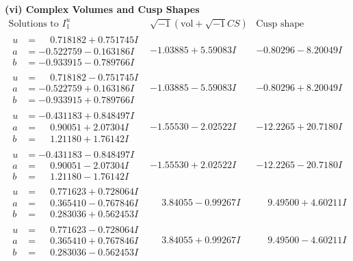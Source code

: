 \documentclass[1p]{elsarticle_modified}
\theoremstyle{definition}
\newcommand{\I}{\sqrt{-1}}
\begin{document}
\newpage\flushleft \textbf{(vi) Complex Volumes and Cusp Shapes}
$$\begin{array}{c|c|c}  
\text{Solutions to }I^u_{1}& \I (\text{vol} + \sqrt{-1}CS) & \text{Cusp shape}\\
 \hline 
\begin{aligned}
u &= \phantom{-}0.718182 + 0.751745 I \\
a &= -0.522759 - 0.163186 I \\
b &= -0.933915 - 0.789766 I\end{aligned}
 & -1.03885 + 5.59083 I & -0.80296 - 8.20049 I \\ \hline\begin{aligned}
u &= \phantom{-}0.718182 - 0.751745 I \\
a &= -0.522759 + 0.163186 I \\
b &= -0.933915 + 0.789766 I\end{aligned}
 & -1.03885 - 5.59083 I & -0.80296 + 8.20049 I \\ \hline\begin{aligned}
u &= -0.431183 + 0.848497 I \\
a &= \phantom{-}0.90051 + 2.07304 I \\
b &= \phantom{-}1.21180 + 1.76142 I\end{aligned}
 & -1.55530 - 2.02522 I & -12.2265 + 20.7180 I \\ \hline\begin{aligned}
u &= -0.431183 - 0.848497 I \\
a &= \phantom{-}0.90051 - 2.07304 I \\
b &= \phantom{-}1.21180 - 1.76142 I\end{aligned}
 & -1.55530 + 2.02522 I & -12.2265 - 20.7180 I \\ \hline\begin{aligned}
u &= \phantom{-}0.771623 + 0.728064 I \\
a &= \phantom{-}0.365410 - 0.767846 I \\
b &= \phantom{-}0.283036 + 0.562453 I\end{aligned}
 & \phantom{-}3.84055 - 0.99267 I & \phantom{-}9.49500 + 4.60211 I \\ \hline\begin{aligned}
u &= \phantom{-}0.771623 - 0.728064 I \\
a &= \phantom{-}0.365410 + 0.767846 I \\
b &= \phantom{-}0.283036 - 0.562453 I\end{aligned}
 & \phantom{-}3.84055 + 0.99267 I & \phantom{-}9.49500 - 4.60211 I \\ \hline\begin{aligned}

\end{aligned}
\end{array}$$
\end{document}
